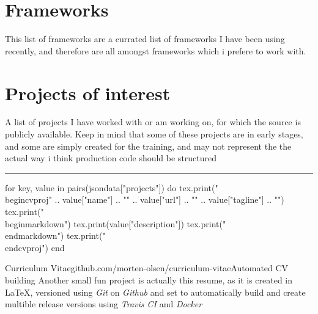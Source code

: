 \section*{Frameworks}

This list of frameworks are a currated list of frameworks I have been using recently, and therefore are all amongst frameworks which i prefere to work with.\\

\begin{cvskills}
\end{cvskills}

\section*{Projects of interest}
A list of projects I have worked with or am working on, for which the source is publicly available. Keep in mind that some of these projects are in early stages, and some are simply created for the training, and may not represent the the actual way i think production code should be structured\\
\hrule

\begin{luacode}
for key, value in pairs(jsondata["projects"]) do
	tex.print("\\begin{cvproj}{" .. value["name"] .. "}{" .. value["url"] .. "}{" .. value["tagline"] .. "}")
	tex.print("\\begin{markdown}")
	tex.print(value["description"])
	tex.print("\\end{markdown}")
	tex.print("\\end{cvproj}")
end
\end{luacode}

\begin{cvproj}{Curriculum Vitae}{github.com/morten-olsen/curriculum-vitae}{Automated CV building}
Another small fun project is actually this resume, as it is created in \LaTeX, versioned using \textit{Git} on \textit{Github} and set to automatically build and create multible release versions using \textit{Travis CI} and \textit{Docker}
\end{cvproj}
